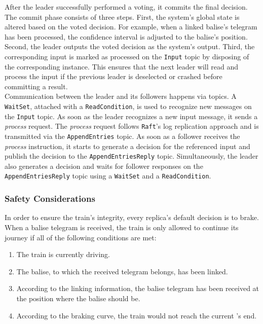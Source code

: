 \noindent
After the leader successfully performed a voting, it commits the final decision.
The commit phase consists of three steps.
First, the system's global state is altered based on the voted decision.
For example, when a linked balise's telegram has been processed, the confidence interval is adjusted to the balise's position.
Second, the leader outputs the voted decision as the system's output.
Third, the corresponding input is marked as processed on the \texttt{Input} topic by disposing of the corresponding  instance.
This ensures that the next leader will read and process the input if the previous leader is deselected or crashed before committing a result.
\\

\noindent
Communication between the leader and its followers happens via  topics.
A \texttt{WaitSet}, attached with a \texttt{ReadCondition}, is used to recognize new messages on the \texttt{Input} topic.
As soon as the leader recognizes a new input message, it sends a \textit{process} request.
The \textit{process} request follows \texttt{Raft}'s log replication approach and is transmitted via the \texttt{AppendEntries} topic.
As soon as a follower receives the \textit{process} instruction, it starts to generate a decision for the referenced input and publish the decision to the \texttt{AppendEntriesReply} topic.
Simultaneously, the leader also generates a decision and waits for follower responses on the \texttt{AppendEntriesReply} topic using a \texttt{WaitSet} and a \texttt{ReadCondition}.

\subsubsection{Safety Considerations}

In order to ensure the train's integrity, every replica's default decision is to brake.
When a balise telegram is received, the train is only allowed to continue its journey if all of the following conditions are met:

\begin{enumerate}
\item The train is currently driving.
\item The balise, to which the received telegram belongs, has been linked.
\item According to the linking information, the balise telegram has been received at the position where the balise should be.
\item According to the braking curve, the train would not reach the current 's end.
\end{enumerate}

